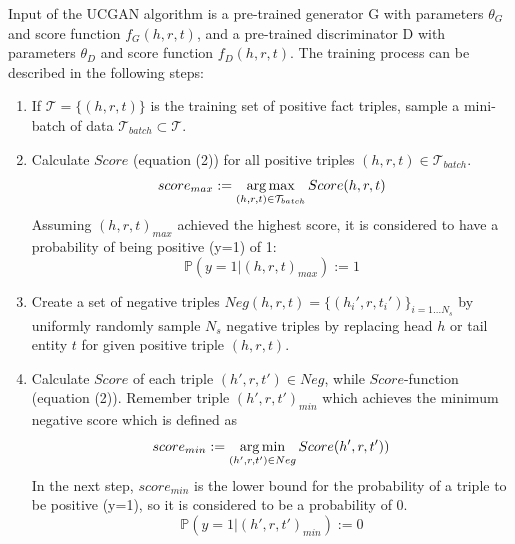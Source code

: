 Input of the \ac{UCGAN} algorithm is a pre-trained generator G with parameters $\theta_G$ and score function $f_G(h,r,t)$, 
and a pre-trained discriminator D with parameters $\theta_D$ and score function $f_D(h,r,t)$.
The training process can be described in the following steps:
\begin{enumerate}
    \item 
    If $\mathcal{T}=\{(h,r,t)\}$ is the training set of positive fact triples, sample a mini-batch of data $\mathcal{T}_{batch} \subset \mathcal{T}$.
 
    \item  Calculate $Score$ (equation (2)) for all positive triples $(h, r, t) \in \mathcal{T}_{batch}$.
    \begin{equation}
        score_{max} := \operatorname*{arg\,max}_{(h,r,t) \in \mathcal{T}_{batch}}{Score(h,r,t)}
    \end{equation}
    Assuming $(h,r,t)_{max}$ achieved the highest score, 
    it is considered to have a probability of being positive (y=1) of 1:
    \begin{equation}
        \mathds{P}(y = 1|(h, r, t)_{max}) := 1
    \end{equation}
    
    \item 
    Create a set of negative triples $Neg(h,r,t)=\{(h_i',r,t_i')\}_{i=1\dots N_s}$ by uniformly randomly sample $N_s$ negative triples by replacing head $h$ or tail entity $t$ for given positive triple $(h, r, t)$.
    
    \item 
    Calculate $Score$ of each triple $(h',r,t') \in Neg$, while $Score$-function (equation (2)).
    Remember triple $(h',r,t')_{min}$ which achieves the minimum negative score which is defined as
    \begin{equation}
        score_{min} := \operatorname*{arg\,min}_{(h', r, t') \in Neg}{Score(h', r, t'))}
    \end{equation}
    In the next step, $score_{min}$ is the lower bound for the probability of a triple to be positive (y=1), so it is considered to be a probability of 0.
    \begin{equation}
        \mathds{P}(y = 1|(h', r, t')_{min}) := 0
    \end{equation}
    

\end{enumerate}
